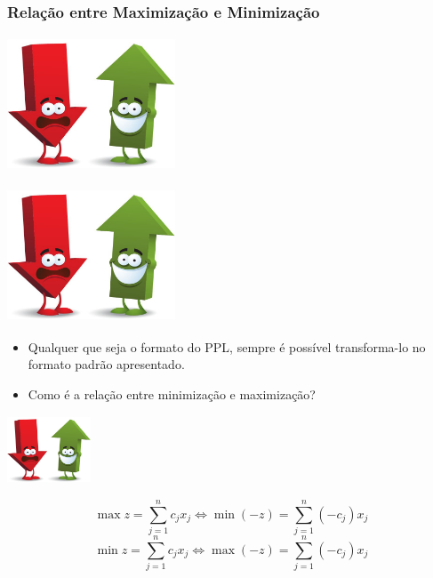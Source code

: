 \documentclass{beamer}
\begin{document}
\begin{frame}
	\frametitle{Relação entre Maximização e Minimização}
	{
		\centering
		\includegraphics[width=5cm,height=4cm]{up-down.jpg}
	}	
	\only<2>
	{
		\centering
		\includegraphics[width=5cm,height=4cm]{up-down.jpg}
		\begin{itemize}
		\item Qualquer que seja o formato do PPL, sempre é possível transforma-lo no formato padrão apresentado.
		\item Como é a relação entre minimização e maximização?
		\end{itemize}
	}	
	{
		\centering
		\includegraphics[width=2.5cm,height=2cm]{up-down.jpg}
		\begin{mdframed}[backgroundcolor=blue!20] 
			\begin{equation*}
				\max z = \sum_{j=1}^{n}c_jx_j \Leftrightarrow \min (-z) = \sum_{j=1}^{n}(-c_j)x_j
			\end{equation*}
			\begin{equation*}
				\min z = \sum_{j=1}^{n}c_jx_j \Leftrightarrow \max (-z) = \sum_{j=1}^{n}(-c_j)x_j
			\end{equation*}
		\end{mdframed}
	}
\end{frame}
\end{document}
